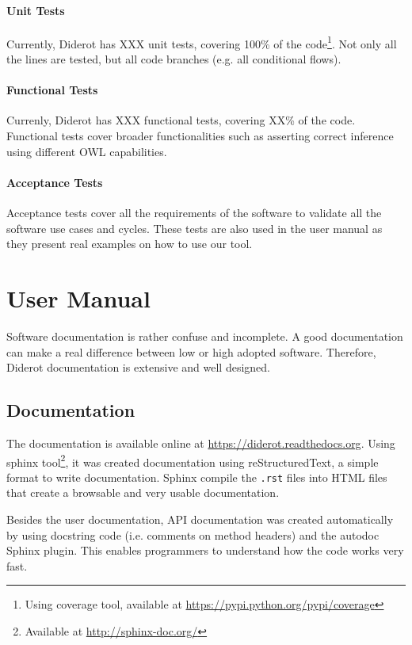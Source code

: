 \documentclass{report}
\begin{document}
\subsubsection{Unit Tests}

Currently, Diderot has XXX unit tests, covering 100\% of the code\footnote{Using coverage tool, available at \url{https://pypi.python.org/pypi/coverage}}.
Not only all the lines are tested, but all code branches (e.g. all conditional flows).

\subsubsection{Functional Tests}

Currenly, Diderot has XXX functional tests, covering XX\% of the code.
Functional tests cover broader functionalities such as asserting correct inference using different OWL capabilities.

\subsubsection{Acceptance Tests}

Acceptance tests cover all the requirements of the software to validate all the software use cases and cycles.
These tests are also used in the user manual \cite{manual} as they present real examples on how to use our tool.

\chapter{User Manual}
\label{manual}

Software documentation is rather confuse and incomplete.
A good documentation can make a real difference between low or high adopted software.
Therefore, Diderot documentation is extensive and well designed.

\section{Documentation}

The documentation is available online at \url{https://diderot.readthedocs.org}.
Using sphinx tool\footnote{Available at \url{http://sphinx-doc.org/}}, it was created documentation using
reStructuredText, a simple format to write documentation.
Sphinx compile the \texttt{.rst} files into HTML files that create a browsable and very usable documentation.

Besides the user documentation, API documentation was created automatically by using docstring code (i.e. comments on method headers) and
the autodoc Sphinx plugin.
This enables programmers to understand how the code works very fast.
\end{document}

